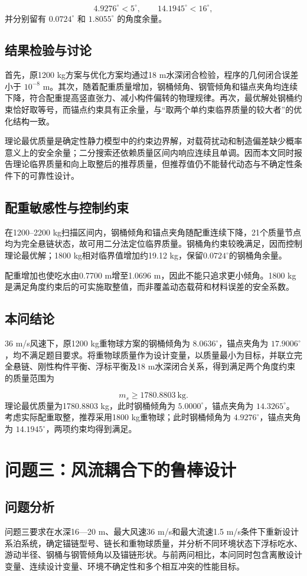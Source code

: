 \documentclass[UTF8,zihao=-4,a4paper,fontset=fandol]{ctexart}
\begin{document}
\[
4.9276^\circ<5^\circ,
\qquad
14.1945^\circ<16^\circ,
\]
并分别留有 \(0.0724^\circ\) 和 \(1.8055^\circ\) 的角度余量。

\subsection{结果检验与讨论}
首先，原1200 kg方案与优化方案均通过18 m水深闭合检验，程序的几何闭合误差小于 \(10^{-8}\) m。其次，随着配重质量增加，钢桶倾角、钢管倾角和锚点夹角均连续下降，符合配重提高竖直张力、减小构件偏转的物理规律。再次，最优解处钢桶约束恰好取等号，而锚点约束具有正余量，与“取两个单约束临界质量的较大者”的优化结构一致。

理论最优质量是确定性静力模型中的约束边界解，对载荷扰动和制造偏差缺少概率意义上的安全余量；二分搜索还依赖质量区间内响应连续且单调。因而本文同时报告理论临界质量和向上取整后的推荐质量，但推荐值仍不能替代动态与不确定性条件下的可靠性设计。

\subsection{配重敏感性与控制约束}
在1200--2200 kg扫描区间内，钢桶倾角和锚点夹角随配重连续下降，21个质量节点均为完全悬链状态，故可用二分法定位临界质量。钢桶角约束较晚满足，因而控制理论最优解；1800 kg相对临界值增加约19.12 kg，保留$0.0724^\circ$的钢桶角余量。

配重增加也使吃水由0.7700 m增至1.0696 m，因此不能只追求更小倾角。1800 kg是满足角度约束后的可实施取整值，而非覆盖动态载荷和材料误差的安全系数。

\subsection{本问结论}
36 m/s风速下，原1200 kg重物球方案的钢桶倾角为 \(8.0636^\circ\)，锚点夹角为 \(17.9006^\circ\)，均不满足题目要求。将重物球质量作为设计变量，以质量最小为目标，并联立完全悬链、刚性构件平衡、浮标平衡及18 m水深闭合关系，得到满足两个角度约束的质量范围为

\[
\boxed{m_s\ge1780.8803\ \mathrm{kg}}.
\]
理论最优质量为1780.8803 kg，此时钢桶倾角为 \(5.0000^\circ\)，锚点夹角为 \(14.3265^\circ\)。考虑实际配重取整，推荐采用1800 kg重物球；此时钢桶倾角为 \(4.9276^\circ\)，锚点夹角为 \(14.1945^\circ\)，两项约束均得到满足。


\section{问题三：风流耦合下的鲁棒设计}
\subsection{问题分析}
问题三要求在水深16—20 m、最大风速36 m/s和最大流速1.5 m/s条件下重新设计系泊系统，确定锚链型号、链长和重物球质量，并分析不同环境状态下浮标吃水、游动半径、钢桶与钢管倾角以及锚链形状。与前两问相比，本问同时包含离散设计变量、连续设计变量、环境不确定性和多个相互冲突的性能目标。
\end{document}
